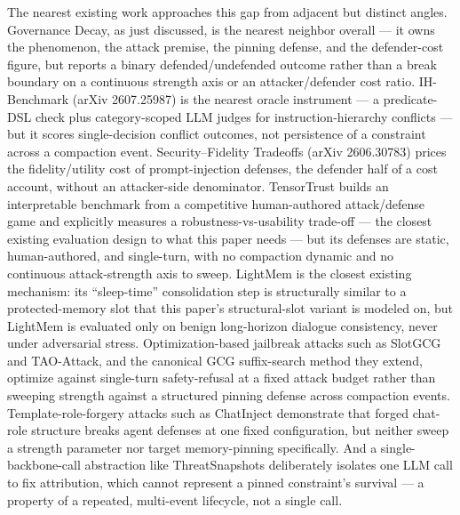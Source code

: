 \documentclass[11pt]{article}
\begin{document}
The nearest existing work approaches this gap from adjacent but distinct angles. Governance Decay, as just discussed, is the nearest neighbor overall --- it owns the phenomenon, the attack premise, the pinning defense, and the defender-cost figure, but reports a binary defended/undefended outcome rather than a break boundary on a continuous strength axis or an attacker/defender cost ratio. IH-Benchmark (arXiv 2607.25987) is the nearest oracle instrument --- a predicate-DSL check plus category-scoped LLM judges for instruction-hierarchy conflicts --- but it scores single-decision conflict outcomes, not persistence of a constraint across a compaction event. Security--Fidelity Tradeoffs (arXiv 2606.30783) prices the fidelity/utility cost of prompt-injection defenses, the defender half of a cost account, without an attacker-side denominator. TensorTrust builds an interpretable benchmark from a competitive human-authored attack/defense game and explicitly measures a robustness-vs-usability trade-off --- the closest existing evaluation design to what this paper needs --- but its defenses are static, human-authored, and single-turn, with no compaction dynamic and no continuous attack-strength axis to sweep. LightMem is the closest existing mechanism: its ``sleep-time'' consolidation step is structurally similar to a protected-memory slot that this paper's structural-slot variant is modeled on, but LightMem is evaluated only on benign long-horizon dialogue consistency, never under adversarial stress. Optimization-based jailbreak attacks such as SlotGCG and TAO-Attack, and the canonical GCG suffix-search method they extend, optimize against single-turn safety-refusal at a fixed attack budget rather than sweeping strength against a structured pinning defense across compaction events. Template-role-forgery attacks such as ChatInject demonstrate that forged chat-role structure breaks agent defenses at one fixed configuration, but neither sweep a strength parameter nor target memory-pinning specifically. And a single-backbone-call abstraction like ThreatSnapshots deliberately isolates one LLM call to fix attribution, which cannot represent a pinned constraint's survival --- a property of a repeated, multi-event lifecycle, not a single call.
\end{document}
